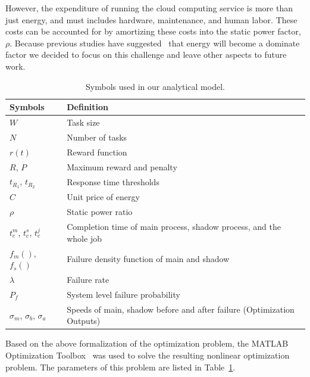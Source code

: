 However, the expenditure of running the cloud computing service is more
than just energy, and must includes hardware, maintenance, and human
labor. These costs can be accounted for by amortizing these costs into the
static power factor, $\rho$. Because previous studies have
suggested~\cite{Elnozahy03energyconservation,Raghavendra:2008:NPS}
that energy will become a dominate factor we decided to focus on this
challenge and leave other aspects to future work.

\begin{table}[!h]
\caption{Symbols used in our analytical model.}
\centering
\begin{tabularx}{\columnwidth}{|l|X|}
\hline
Symbols                          & Definition                         \\
\hline
$W$                               & Task size                       \\
\hline
$N$                               & Number of tasks                 \\
\hline
$r(t)$                          & Reward function       \\
\hline
$R$, $P$                            & Maximum reward and penalty      \\
\hline
$t_{R_1}$, $t_{R_2}$             & Response time thresholds  \\
\hline
$C$                               & Unit price of energy            \\
\hline
$\rho$                          & Static power ratio                 \\
\hline
$t_c^m$, $t_c^s$, $t_c^{j}$                 & Completion time of main process, shadow process, and the whole job \\
\hline
$f_m()$, $f_s()$                    & Failure density function of main and shadow  \\
\hline
$\lambda$                           & Failure rate    \\
\hline
$P_f$                               & System level failure probability \\
\hline
$\sigma_m$, $\sigma_b$, $ \sigma_a$  & Speeds of main, shadow before and after failure (Optimization Outputs) \\
\hline
\end{tabularx}

\label{tbl:symbols}
\end{table}

Based on the above formalization of the optimization problem, the
MATLAB Optimization Toolbox~\cite{matlab_opt} was used to solve the
resulting nonlinear optimization problem. The parameters of this
problem are listed in Table~\ref{tbl:symbols}. 



